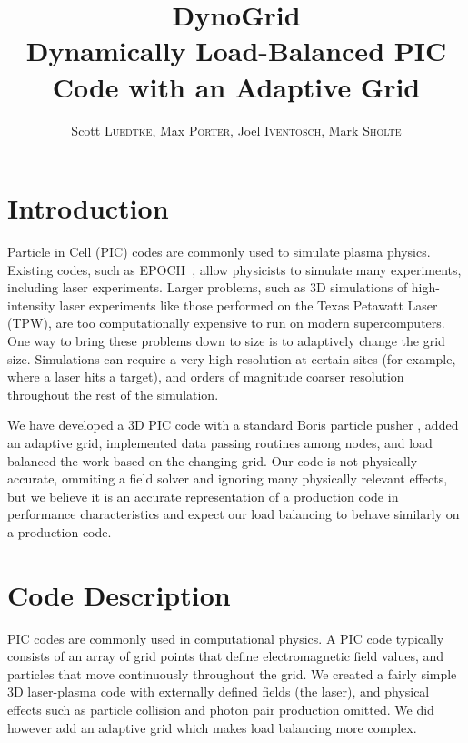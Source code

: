 \documentclass[]{article}
\begin{document}
\title{DynoGrid\\{\Large Dynamically Load-Balanced PIC Code with an Adaptive Grid}}

\author{Scott \textsc{Luedtke}, Max \textsc{Porter}, Joel \textsc{Iventosch}, Mark \textsc{Sholte}}

\maketitle

\section{Introduction}

Particle in Cell (PIC) codes are commonly used to simulate plasma physics.  Existing codes, such as EPOCH~\cite{epoch}, allow physicists to simulate many experiments, including laser experiments.  Larger problems, such as 3D simulations of high-intensity laser experiments like those performed on the Texas Petawatt Laser (TPW), are too computationally expensive to run on modern supercomputers.  One way to bring these problems down to size is to adaptively change the grid size.  Simulations can require a very high resolution at certain sites (for example, where a laser hits a target), and orders of magnitude coarser resolution throughout the rest of the simulation.

We have developed a 3D PIC code with a standard Boris particle pusher \cite{bird}, added an adaptive grid, implemented data passing routines among nodes, and load balanced the work based on the changing grid.  Our code is not physically accurate, ommiting a field solver and ignoring many physically relevant effects, but we believe it is an accurate representation of a production code in performance characteristics and expect our load balancing to behave similarly on a production code.


\section{Code Description}
PIC codes are commonly used in computational physics.  A PIC code typically consists of an array of grid points that define electromagnetic field values, and particles that move continuously throughout the grid.  We created a fairly simple 3D laser-plasma code with externally defined fields (the laser), and physical effects such as particle collision and photon pair production omitted.  We did however add an adaptive grid which makes load balancing more complex.
\end{document}
